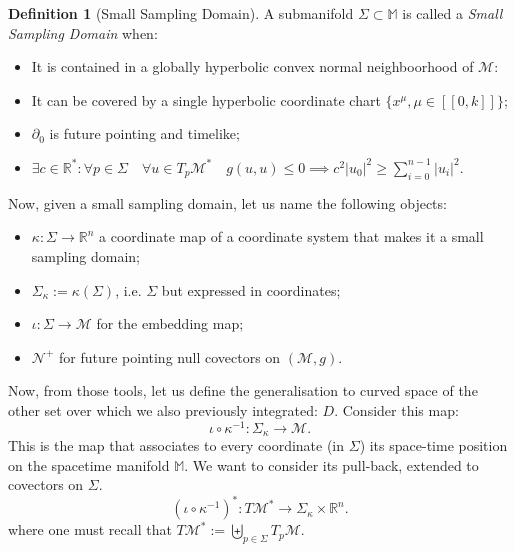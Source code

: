 \documentclass[a4paper,11pt]{article}
\numberwithin{equation}{section}
\theoremstyle{definition}
\newtheorem{definition}{Definition}
\newtheorem{comment}{Comment}
\begin{document}
\begin{definition}[Small Sampling Domain]
    A submanifold $\Sigma \subset \mathbb{M}$ is called a \emph{Small Sampling Domain} when:
    \begin{itemize}
        \item It is contained in a globally hyperbolic convex normal neighboorhood of $\mathcal{M}$:
        \item It can be covered by a single hyperbolic coordinate chart $\{x^\mu, \mu\in [\![0,k]\!]\}$;
        \item  $\partial_0$ is future pointing and timelike;
        \item $\exists c \in \mathbb{R}^* : \forall p \in \Sigma \quad \forall u \in T_p\mathcal{M}^* \quad g(u,u)\leq 0 \implies c^2|u_0|^2 \geq \sum_{i=0}^{n-1} |u_i|^2$.
    \end{itemize}
\end{definition}

Now, given a small sampling domain, let us name the following objects:
\begin{itemize}
	\item $\kappa : \Sigma \to \mathbb{R}^n$ a coordinate map of a coordinate system that makes it a small sampling domain;
	\item $\Sigma_\kappa:=\kappa(\Sigma)$,  i.e. $\Sigma$ but expressed in coordinates;
	\item $\iota : \Sigma \to \mathcal{M}$ for the embedding map; 
	\item $\mathcal{N}^+$ for future pointing null covectors on $(\mathcal{M},g)$.
\end{itemize}

Now, from those tools, let us define the generalisation to curved space of the other set over which we also previously integrated: $D$. Consider this map:
$$\iota \circ \kappa^{-1}: \Sigma_\kappa \to \mathcal{M}.$$ 
This is the map that associates to every coordinate (in $\Sigma$) its space-time position on the spacetime manifold $\mathbb{M}$. We want to consider its pull-back, extended to covectors on $\Sigma$.
$$(\iota \circ \kappa^{-1})^*: T\mathcal{M}^* \to \Sigma_\kappa \times \mathbb{R}^n.$$
where one must recall that $T\mathcal{M}^* := \underset{p\in \Sigma}{ \biguplus} T_p\mathcal{M}$.
\end{document}

